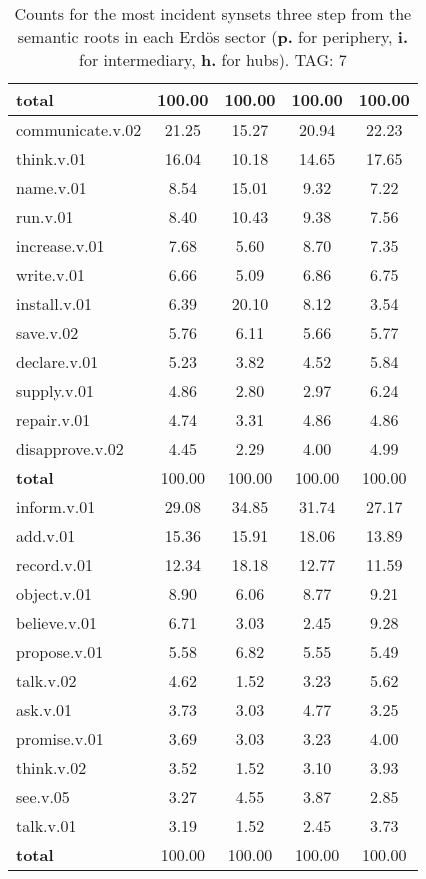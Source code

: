 \begin{table}[h!]
\begin{center}
\begin{tabular}{| l || c | c | c | c |}
{{\bf total}} & 100.00  & 100.00  & 100.00  & 100.00 \\\hline\hline\hline
communicate.v.02 & 21.25  & 15.27  & 20.94  & 22.23 \\\hline
think.v.01 & 16.04  & 10.18  & 14.65  & 17.65 \\\hline
name.v.01 & 8.54  & 15.01  & 9.32  & 7.22 \\\hline
run.v.01 & 8.40  & 10.43  & 9.38  & 7.56 \\\hline
increase.v.01 & 7.68  & 5.60  & 8.70  & 7.35 \\\hline
write.v.01 & 6.66  & 5.09  & 6.86  & 6.75 \\\hline
install.v.01 & 6.39  & 20.10  & 8.12  & 3.54 \\\hline
save.v.02 & 5.76  & 6.11  & 5.66  & 5.77 \\\hline
declare.v.01 & 5.23  & 3.82  & 4.52  & 5.84 \\\hline
supply.v.01 & 4.86  & 2.80  & 2.97  & 6.24 \\\hline
repair.v.01 & 4.74  & 3.31  & 4.86  & 4.86 \\\hline
disapprove.v.02 & 4.45  & 2.29  & 4.00  & 4.99 \\\hline\hline
{{\bf total}} & 100.00  & 100.00  & 100.00  & 100.00 \\\hline\hline\hline
inform.v.01 & 29.08  & 34.85  & 31.74  & 27.17 \\\hline
add.v.01 & 15.36  & 15.91  & 18.06  & 13.89 \\\hline
record.v.01 & 12.34  & 18.18  & 12.77  & 11.59 \\\hline
object.v.01 & 8.90  & 6.06  & 8.77  & 9.21 \\\hline
believe.v.01 & 6.71  & 3.03  & 2.45  & 9.28 \\\hline
propose.v.01 & 5.58  & 6.82  & 5.55  & 5.49 \\\hline
talk.v.02 & 4.62  & 1.52  & 3.23  & 5.62 \\\hline
ask.v.01 & 3.73  & 3.03  & 4.77  & 3.25 \\\hline
promise.v.01 & 3.69  & 3.03  & 3.23  & 4.00 \\\hline
think.v.02 & 3.52  & 1.52  & 3.10  & 3.93 \\\hline
see.v.05 & 3.27  & 4.55  & 3.87  & 2.85 \\\hline
talk.v.01 & 3.19  & 1.52  & 2.45  & 3.73 \\\hline\hline
{{\bf total}} & 100.00  & 100.00  & 100.00  & 100.00 \\\hline
\end{tabular}
\caption{Counts for the most incident synsets three step from the semantic roots in each Erd\"os sector ({\bf p.} for periphery, {\bf i.} for intermediary, {\bf h.} for hubs). TAG: 7}
\end{center}
\end{table}